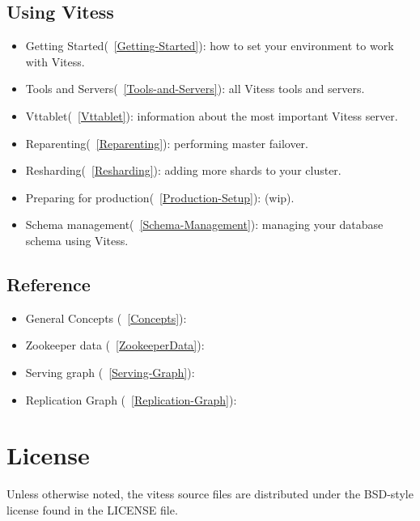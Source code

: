 \subsection{Using Vitess}\label{using-vitess}

\begin{itemize}
\item Getting Started(~\ref{Getting-Started}):  how to set your environment to work with Vitess.
\item Tools and Servers(~\ref{Tools-and-Servers}):  all Vitess tools and servers.
\item Vttablet(~\ref{Vttablet}):  information about the most important Vitess server.
\item Reparenting(~\ref{Reparenting}):  performing master failover.
\item Resharding(~\ref{Resharding}):  adding more shards to your cluster.
\item Preparing for production(~\ref{Production-Setup}): (wip).
\item Schema management(~\ref{Schema-Management}): managing your database schema using Vitess.
\end{itemize}

\subsection{Reference}

\begin{itemize}
\item General Concepts (~\ref{Concepts}):
\item Zookeeper data (~\ref{ZookeeperData}):
\item Serving graph (~\ref{Serving-Graph}):
\item Replication Graph (~\ref{Replication-Graph}):
\end{itemize}

\section{License}\hypertarget{license}{}\label{license}

Unless otherwise noted, the vitess source files are distributed
under the BSD-style license found in the LICENSE file.

